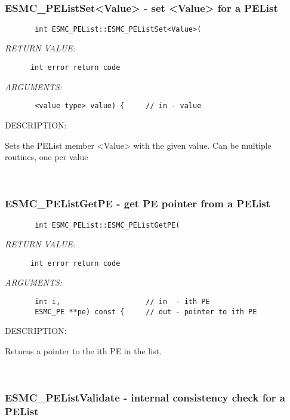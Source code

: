\mbox{}\hrulefill\ 
 
\subsubsection{ESMC\_PEListSet<Value> - set <Value> for a PEList}


  
\begin{verbatim}       int ESMC_PEList::ESMC_PEListSet<Value>(\end{verbatim}{\em RETURN VALUE:}
\begin{verbatim}      int error return code\end{verbatim}{\em ARGUMENTS:}
\begin{verbatim}       <value type> value) {     // in - value\end{verbatim}
{\sf DESCRIPTION:\\ }


       Sets the PEList member <Value> with the given value.
       Can be multiple routines, one per value
   
 
\mbox{}\hrulefill\ 
 
\subsubsection{ESMC\_PEListGetPE - get PE pointer from a PEList}


  
\begin{verbatim}       int ESMC_PEList::ESMC_PEListGetPE(\end{verbatim}{\em RETURN VALUE:}
\begin{verbatim}      int error return code\end{verbatim}{\em ARGUMENTS:}
\begin{verbatim}       int i,                    // in  - ith PE
       ESMC_PE **pe) const {     // out - pointer to ith PE\end{verbatim}
{\sf DESCRIPTION:\\ }


       Returns a pointer to the ith PE in the list.
   
 
\mbox{}\hrulefill\ 
 
\subsubsection{ESMC\_PEListValidate - internal consistency check for a PEList}


